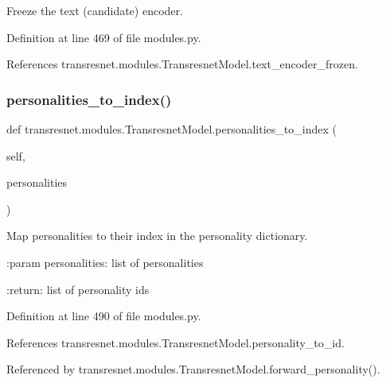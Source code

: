 \begin{DoxyVerb}Freeze the text (candidate) encoder.\end{DoxyVerb}
 

Definition at line 469 of file modules.\+py.



References transresnet.\+modules.\+Transresnet\+Model.\+text\+\_\+encoder\+\_\+frozen.

\mbox{\label{classtransresnet_1_1modules_1_1TransresnetModel_a850b8d781e749d3242788dc8e344b8fe}} 
\subsubsection{\texorpdfstring{personalities\+\_\+to\+\_\+index()}{personalities\_to\_index()}}
{\footnotesize\ttfamily def transresnet.\+modules.\+Transresnet\+Model.\+personalities\+\_\+to\+\_\+index (\begin{DoxyParamCaption}\item[{}]{self,  }\item[{}]{personalities }\end{DoxyParamCaption})}

\begin{DoxyVerb}Map personalities to their index in the personality dictionary.

:param personalities:
    list of personalities

:return:
    list of personality ids
\end{DoxyVerb}
 

Definition at line 490 of file modules.\+py.



References transresnet.\+modules.\+Transresnet\+Model.\+personality\+\_\+to\+\_\+id.



Referenced by transresnet.\+modules.\+Transresnet\+Model.\+forward\+\_\+personality().

